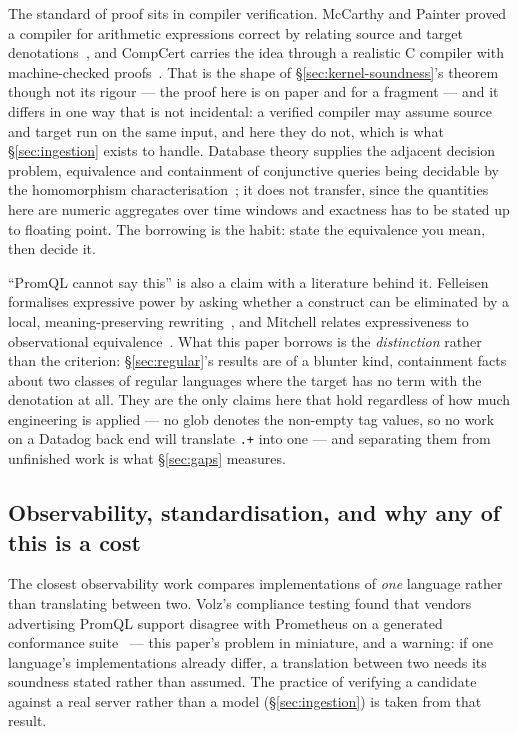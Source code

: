 The standard of proof sits in compiler verification. McCarthy and Painter proved a
compiler for arithmetic expressions correct by relating source and target
denotations~\citep{mccarthy1967}, and CompCert carries the idea through a realistic C
compiler with machine-checked proofs~\citep{leroy2009}. That is the shape of
\S\ref{sec:kernel-soundness}'s theorem though not its rigour --- the proof here is on
paper and for a fragment --- and it differs in one way that is not incidental: a verified
compiler may assume source and target run on the same input, and here they do not, which
is what \S\ref{sec:ingestion} exists to handle. Database theory supplies the adjacent
decision problem, equivalence and containment of conjunctive queries being decidable by
the homomorphism characterisation~\citep{chandra1977,abiteboul1995}; it does not transfer,
since the quantities here are numeric aggregates over time windows and exactness has to
be stated up to floating point. The borrowing is the habit: state the equivalence you
mean, then decide it.

``PromQL cannot say this'' is also a claim with a literature behind it. Felleisen
formalises expressive power by asking whether a construct can be eliminated by a local,
meaning-preserving rewriting~\citep{felleisen1991}, and Mitchell relates expressiveness
to observational equivalence~\citep{mitchell1993}. What this paper borrows is the
\emph{distinction} rather than the criterion: \S\ref{sec:regular}'s results are of a
blunter kind, containment facts about two classes of regular languages where the target
has no term with the denotation at all. They are the only claims here that hold
regardless of how much engineering is applied --- no glob denotes the non-empty tag
values, so no work on a Datadog back end will translate \texttt{.+} into one --- and
separating them from unfinished work is what \S\ref{sec:gaps} measures.

\subsection{Observability, standardisation, and why any of this is a cost}

The closest observability work compares implementations of \emph{one} language rather
than translating between two. Volz's compliance testing found that vendors advertising
PromQL support disagree with Prometheus on a generated conformance suite~\citep{volz2020}
--- this paper's problem in miniature, and a warning: if one language's implementations
already differ, a translation between two needs its soundness stated rather than assumed.
The practice of verifying a candidate against a real server rather than a model
(\S\ref{sec:ingestion}) is taken from that result.

